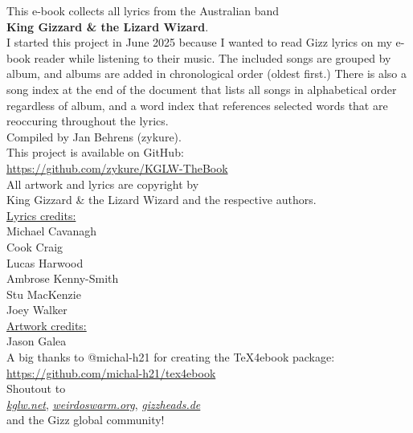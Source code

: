\begin{center}
{%
\vspace*{\fill}%

This e-book collects all lyrics from the Australian band \\
\textbf{King Gizzard \& the Lizard Wizard}. \\[1em]
I started this project in June 2025 because I wanted to read Gizz lyrics on my e-book reader while listening to their music.
The included songs are grouped by album, and albums are added in chronological order (oldest first.)
There is also a song index at the end of the document that lists all songs in alphabetical order regardless of album,
and a word index that references selected words that are reoccuring throughout the lyrics. \\[1em]

Compiled by Jan Behrens (zykure). \\[1em]

This project is available on GitHub: \\
\href{https://github.com/zykure/KGLW-TheBook}{https://github.com/zykure/KGLW-TheBook} \\[2em]

All artwork and lyrics are copyright by \\
King Gizzard \& the Lizard Wizard and the respective authors. \\[2em]

\underline{Lyrics credits:} \\
Michael Cavanagh \\
Cook Craig \\
Lucas Harwood \\
Ambrose Kenny-Smith \\
Stu MacKenzie \\
Joey Walker \\[2em]

\underline{Artwork credits:} \\
Jason Galea \\[2em]

A big thanks to @michal-h21 for creating the TeX4ebook package: \\
\href{https://github.com/michal-h21/tex4ebook}{https://github.com/michal-h21/tex4ebook} \\[1em]

Shoutout to \\
\href{https://kglw.net}{\textit{kglw.net}}, \href{https://weirdoswarm.org}{\textit{weirdoswarm.org}}, \href{https://gizzheads.de}{\textit{gizzheads.de}} \\
and the Gizz global community! \\

\vfill%
}%
\end{center}

